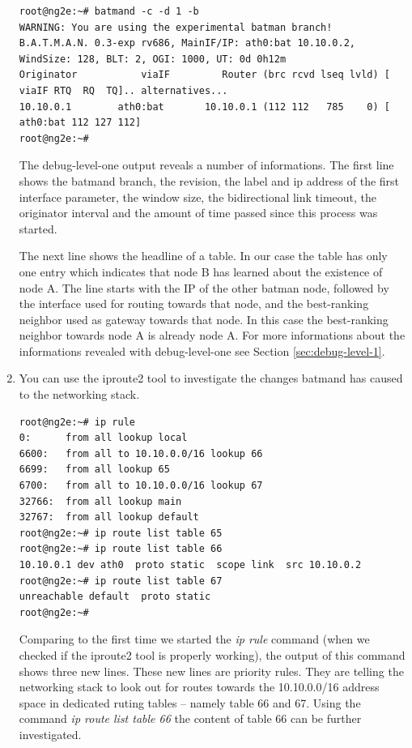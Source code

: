 \documentclass[11pt]{article}
\begin{document}
\begin{enumerate}
\begin{small} \begin{verbatim}
root@ng2e:~# batmand -c -d 1 -b
WARNING: You are using the experimental batman branch!
B.A.T.M.A.N. 0.3-exp rv686, MainIF/IP: ath0:bat 10.10.0.2, WindSize: 128, BLT: 2, OGI: 1000, UT: 0d 0h12m
Originator           viaIF         Router (brc rcvd lseq lvld) [    viaIF RTQ  RQ  TQ].. alternatives...
10.10.0.1        ath0:bat       10.10.0.1 (112 112   785    0) [ ath0:bat 112 127 112]
root@ng2e:~#
\end{verbatim} \end{small}

The debug-level-one output reveals a number of informations. The first line shows the batmand branch, the revision, the label and ip address of the first interface parameter, the window size, the bidirectional link timeout, the originator interval and the amount of time passed since this process was started. 

The next line shows the headline of a table. 
In our case the table has only one entry which indicates that node B has learned about the existence of node A.
The line starts with the IP of the other batman node, followed by the interface used for routing towards that node, and the best-ranking neighbor used as gateway towards that node. In this case the best-ranking neighbor towards node A is already node A.
For more informations about the informations revealed with debug-level-one see Section \ref{sec:debug-level-1}.

\item You can use the iproute2 tool to investigate the changes batmand has caused to the networking stack.

\begin{small} \begin{verbatim}
root@ng2e:~# ip rule
0:      from all lookup local
6600:   from all to 10.10.0.0/16 lookup 66
6699:   from all lookup 65
6700:   from all to 10.10.0.0/16 lookup 67
32766:  from all lookup main
32767:  from all lookup default
root@ng2e:~# ip route list table 65
root@ng2e:~# ip route list table 66
10.10.0.1 dev ath0  proto static  scope link  src 10.10.0.2
root@ng2e:~# ip route list table 67
unreachable default  proto static
root@ng2e:~#
\end{verbatim} \end{small}

Comparing to the first time we started the \emph{ip rule} command (when we checked if the iproute2 tool is properly working), the output of this command shows three new lines. 
These new lines are priority rules. 
They are telling the networking stack to look out for routes towards the 10.10.0.0/16 address space in dedicated ruting tables -- namely table 66 and 67. 
Using the command \emph{ip route list table 66} the content of table 66 can be further investigated. 


\end{enumerate}
\end{document}
